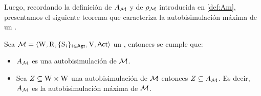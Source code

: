 Luego, recordando la definición de $A_{\mathcal{M}}$ y de $\rho_{\mathcal{M}}$ introducida en \ref{def:Am}, presentamos el siguiente teorema 
que caracteriza la autobisimulación máxima de un \ults.

\begin{teorema}
    Sea $\mathcal{M}=\langle \mathrm{W},\mathrm{R},\{ \mathrm{S}_i \}_{i \in {\rm \sf Agt}},\mathrm{V},{\rm \sf Act} \rangle$ un \ults, entonces se cumple que:
    \begin{itemize}
        \item $A_{\mathcal{M}}$ es una autobisimulación de $\mathcal{M}$.
        \item Sea $Z \subseteq \mathrm{W} \times \mathrm{W}$ una autobisimulación de $\mathcal{M}$ entonces $Z \subseteq A_{\mathcal{M}}$. 
        Es decir, $A_{\mathcal{M}} $ es la autobisimulación máxima de $\mathcal{M}$. 
    \end{itemize}
\end{teorema}

